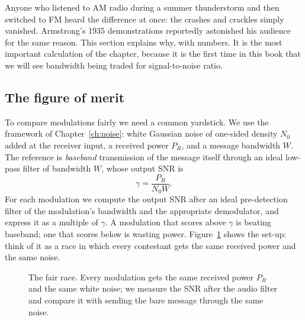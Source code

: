 Anyone who listened to AM radio during a summer thunderstorm and then switched to FM heard the difference
at once: the crashes and crackles simply vanished. Armstrong's 1935 demonstrations reportedly astonished
his audience for the same reason. This section explains why, with numbers. It is the most important calculation of the
chapter, because it is the first time in this book that we will see bandwidth being traded for
signal-to-noise ratio.

\subsection{The figure of merit}

To compare modulations fairly we need a common yardstick. We use the framework of
Chapter~\ref{ch:noise}: white Gaussian noise of one-sided density $N_0$ added at the receiver input, a
received power $P_R$, and a message bandwidth $W$. The reference is \emph{baseband} transmission of the
message itself through an ideal low-pass filter of bandwidth $W$, whose output SNR is
\begin{equation}
\gamma=\frac{P_R}{N_0W}.
\label{eq:ch04:gamma}
\end{equation}
For each modulation we compute the output SNR after an ideal pre-detection filter of the modulation's
bandwidth and the appropriate demodulator, and express it as a multiple of $\gamma$. A modulation that
scores above $\gamma$ is beating baseband; one that scores below is wasting power. Figure~\ref{fig:ch04_snr_setup}
shows the set-up: think of it as a race in which every contestant gets the same received power and the same
noise.

\begin{figure}[htbp]\centering
{}
\caption{The fair race. Every modulation gets the same received power $P_R$ and the same white noise; we
measure the SNR after the audio filter and compare it with sending the bare message through the same noise.}
\label{fig:ch04_snr_setup}
\end{figure}

